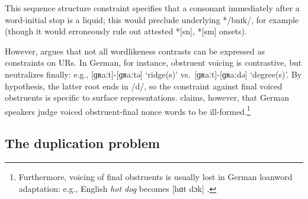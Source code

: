 \noindent
This sequence structure constraint specifies that a consonant immediately after a word-initial stop is a liquid; this would preclude underlying */bnɪk/, for example (though it would erroneously rule out attested *[sn], *[sm] onsets).

However, \citet{Shibatani1973} argues that not all wordlikeness contrasts can be expressed as constraints on URs.
In German, for instance, obstruent voicing is contrastive, but neutralizes finally: e.g., [ɡʀaːt]-[ɡʀaːtə] `ridge(s)' vs.~[ɡʀaːt]-[ɡʀaːdə] `degree(s)'.
By hypothesis, the latter root ends in /d/, so the constraint against final voiced obstruents is specific to surface representations.
\citeauthor{Shibatani1973} claims, however, that German speakers judge voiced obstruent-final nonce words to be ill-formed.\footnote{
    Furthermore, voicing of final obstruents is usually lost in German loanword adaptation: e.g., English \emph{hot dog} becomes [hɑt dɔk] \citep[506]{Ussishkin2003}.}

\subsection{The duplication problem}
\label{ss:dp}


